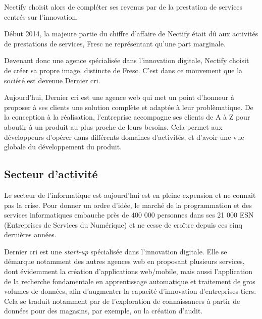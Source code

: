 \documentclass[12pt,a4paper]{article}
\begin{document}
  \bigskip

  Nectify choisit alors de compléter ses revenus par de la prestation de
  services centrés sur l'innovation.

  \bigskip

  Début 2014, la majeure partie du chiffre d'affaire de Nectify était dû
  aux activités de prestations de services, Fresc ne représentant qu'une
  part marginale.

  \bigskip

  Devenant donc une agence spécialisée dans l'innovation digitale, Nectify
  choisit de créer sa propre image, distincte de Fresc. C'est dans ce
  mouvement que la société est devenue Dernier cri.

  \bigskip

  Aujourd'hui, Dernier cri est une agence web qui met un point d'honneur à
  proposer à ses clients une solution complète et adaptée à leur
  problèmatique. De la conception à la réalisation, l'entreprise
  accompagne ses clients de A à Z pour aboutir à un produit au plus proche
  de leurs besoins. Cela permet aux développeurs d'opérer dans différents
  domaines d'activités, et d'avoir une vue globale du développement du
  produit.

  \bigskip

  \subsection{Secteur d'activité}\label{secteur-dactivituxe9}

  \bigskip

  Le secteur de l'informatique est aujourd'hui est en pleine expension et
  ne connait pas la crise. Pour donner un ordre d'idée, le marché de la
  programmation et des services informatiques embauche près de 400 000
  personnes dans ses 21 000 ESN (Entreprises de Services du Numérique) et
  ne cesse de croître depuis ces cinq dernières années.

  \bigskip

  Dernier cri est une \emph{start-up} spécialisée dans l'innovation
  digitale. Elle se démarque notamment des autres agences web en proposant
  plusieurs services, dont évidemment la création d'applications
  web/mobile, mais aussi l'application de la recherche fondamentale en
  apprentissage automatique et traitement de gros volumes de données, afin
  d'augmenter la capacité d'innovation d'entreprises tiers. Cela se
  traduit notamment par de l'exploration de connaissances à partir de
  données pour des magasins, par exemple, ou la création d'audit.
\end{document}
